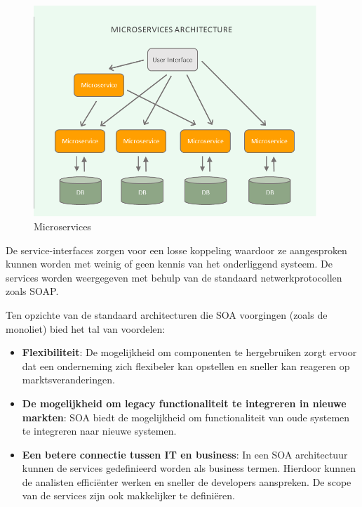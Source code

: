 \begin{figure}
    \caption{Microservices}
    \centering
    \includegraphics[width=0.95\textwidth]{Microservices.png}
\end{figure}

De service-interfaces zorgen voor een losse koppeling waardoor ze aangesproken kunnen worden met weinig of geen kennis van het onderliggend systeem. De services worden weergegeven met behulp van de standaard netwerkprotocollen zoals SOAP.

Ten opzichte van de standaard architecturen die SOA voorgingen (zoals de monoliet) bied het tal van voordelen:
\begin{itemize}
     \item \textbf{Flexibiliteit}: De mogelijkheid om componenten te hergebruiken zorgt ervoor dat een onderneming zich flexibeler kan opstellen en sneller kan reageren op marktsveranderingen. 
     \item \textbf{De mogelijkheid om legacy functionaliteit te integreren in nieuwe markten}: SOA biedt de mogelijkheid om functionaliteit van oude systemen te integreren naar nieuwe systemen.
     \item \textbf{Een betere connectie tussen IT en business}: In een SOA architectuur kunnen de services gedefinieerd worden als business termen. Hierdoor kunnen de analisten efficiënter werken en sneller de developers aanspreken. De scope van de services zijn ook makkelijker te definiëren.
\end{itemize} 

